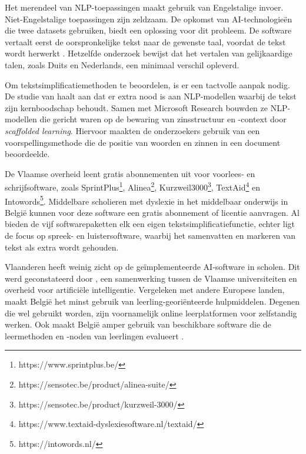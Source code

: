 Het merendeel van NLP-toepassingen maakt gebruik van Engelstalige invoer. Niet-Engelstalige toepassingen zijn zeldzaam. De opkomst van AI-technologieën die twee datasets gebruiken, biedt een oplossing voor dit probleem. De software vertaalt eerst de oorspronkelijke tekst naar de gewenste taal, voordat de tekst wordt herwerkt \autocite{Sciforce2020}. Hetzelfde onderzoek bewijst dat het vertalen van gelijkaardige talen, zoals Duits en Nederlands, een minimaal verschil opleverd.

Om tekstsimplificatiemethoden te beoordelen, is er een tactvolle aanpak nodig. De studie van \textcite{Swayamdipta2019} haalt aan dat er extra nood is aan NLP-modellen waarbij de tekst zijn kernboodschap behoudt. Samen met Microsoft Research bouwden ze NLP-modellen die gericht waren op de bewaring van zinsstructuur en -context door \emph{scaffolded learning}. Hiervoor maakten de onderzoekers gebruik van een voorspellingsmethode die de positie van woorden en zinnen in een document beoordeelde.

De Vlaamse overheid leent gratis abonnementen uit voor voorlees- en schrijfsoftware, zoals \newline SprintPlus\footnote{https://www.sprintplus.be/}, Alinea\footnote{https://sensotec.be/product/alinea-suite/}, Kurzweil3000\footnote{https://sensotec.be/product/kurzweil-3000/}, TextAid\footnote{https://www.textaid-dyslexiesoftware.nl/textaid/} en Intowords\footnote{https://intowords.nl/}. Middelbare scholieren met dyslexie in het middelbaar onderwijs in België kunnen voor deze software een gratis abonnement of licentie aanvragen. Al bieden de vijf softwarepaketten elk een eigen tekstsimplificatiefunctie, echter ligt de focus op spreek- en luistersoftware, waarbij het samenvatten en markeren van tekst als extra wordt gehouden.

Vlaanderen heeft weinig zicht op de geïmplementeerde AI-software in scholen. Dit werd geconstateerd door \autocite{Martens2021}, een samenwerking tussen de Vlaamse universiteiten en overheid voor artificiële intelligentie. Vergeleken met andere Europese landen, maakt België het minst gebruik van leerling-georiënteerde hulpmiddelen. Degenen die wel gebruikt worden, zijn voornamelijk online leerplatformen voor zelfstandig werken. Ook maakt België amper gebruik van beschikbare software die de leermethoden en -noden van leerlingen evalueert \autocite{Martens2021a}. 



